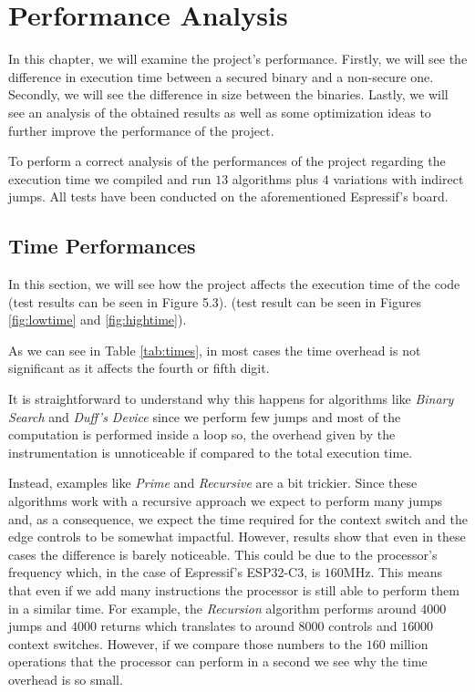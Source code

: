 \chapter{Performance Analysis}
\label{cha:pa}

In this chapter, we will examine the project's performance. Firstly, we will see
the difference in execution time between a secured binary and a non-secure one.
Secondly, we will see the difference in size between the binaries. Lastly, we will
see an analysis of the obtained results as well as some optimization ideas to further
improve the performance of the project.

To perform a correct analysis of the performances of the project regarding the execution
time we compiled and run $13$ algorithms plus $4$ variations with indirect jumps.
All tests have been conducted on the aforementioned Espressif's board.

\section{Time Performances}
\label{sec:pa_time}

In this section, we will see how the project affects the execution time of the
code (test results can be seen in Figure 5.3). (test result can be seen in
Figures \ref{fig:lowtime} and \ref{fig:hightime}).

As we can see in Table \ref{tab:times}, in most cases the time overhead is not
significant as it affects the fourth or fifth digit.

It is straightforward to understand why this happens for algorithms like \textit{Binary
Search} and \textit{Duff's Device} since we perform few jumps and most of the
computation is performed inside a loop so, the overhead given by the instrumentation
is unnoticeable if compared to the total execution time.

Instead, examples like \textit{Prime} and \textit{Recursive} are a bit trickier.
Since these algorithms work with a recursive approach we expect to perform many jumps
and, as a consequence, we expect the time required for the context switch and the
edge controls to be somewhat impactful. However, results show that even in these
cases the difference is barely noticeable. This could be due to the processor's
frequency which, in the case of Espressif's ESP32-C3, is $160$MHz. This means
that even if we add many instructions the processor is still able to perform
them in a similar time. For example, the \textit{Recursion} algorithm performs around
$4000$ jumps and $4000$ returns which translates to around $8000$ controls and $1
6000$ context switches. However, if we compare those numbers to the $160$ million
operations that the processor can perform in a second we see why the time overhead
is so small.

